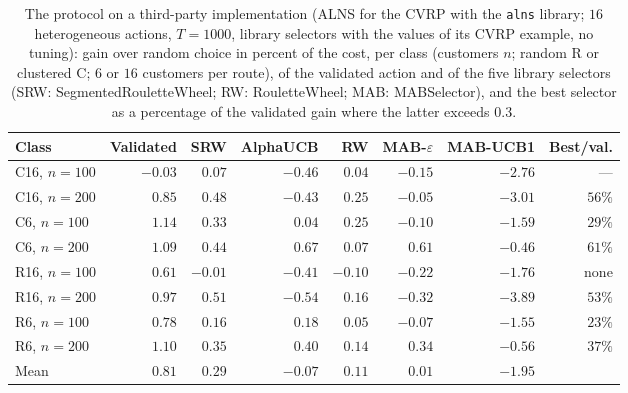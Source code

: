 \begin{table}[t]
\caption{The protocol on a third-party implementation (ALNS for the CVRP with the \texttt{alns} library; $16$ heterogeneous actions, $T=1000$, library selectors with the values of its CVRP example, no tuning): gain over random choice in percent of the cost, per class (customers $n$; random R or clustered C; $6$ or $16$ customers per route), of the validated action and of the five library selectors (SRW: SegmentedRouletteWheel; RW: RouletteWheel; MAB: MABSelector), and the best selector as a percentage of the validated gain where the latter exceeds $0.3$.}
\label{tab:cvrp}
\centering
{\scriptsize\setlength{\tabcolsep}{3pt}
\begin{tabular}{@{}lrrrrrrr@{}}
\toprule
Class & Validated & SRW & AlphaUCB & RW & MAB-$\varepsilon$ & MAB-UCB1 & Best/val. \\
\midrule
C16, $n=100$ & $-0.03$ & $0.07$ & $-0.46$ & $0.04$ & $-0.15$ & $-2.76$ & --- \\
C16, $n=200$ & $0.85$ & $0.48$ & $-0.43$ & $0.25$ & $-0.05$ & $-3.01$ & $56\%$ \\
C6, $n=100$ & $1.14$ & $0.33$ & $0.04$ & $0.25$ & $-0.10$ & $-1.59$ & $29\%$ \\
C6, $n=200$ & $1.09$ & $0.44$ & $0.67$ & $0.07$ & $0.61$ & $-0.46$ & $61\%$ \\
R16, $n=100$ & $0.61$ & $-0.01$ & $-0.41$ & $-0.10$ & $-0.22$ & $-1.76$ & none \\
R16, $n=200$ & $0.97$ & $0.51$ & $-0.54$ & $0.16$ & $-0.32$ & $-3.89$ & $53\%$ \\
R6, $n=100$ & $0.78$ & $0.16$ & $0.18$ & $0.05$ & $-0.07$ & $-1.55$ & $23\%$ \\
R6, $n=200$ & $1.10$ & $0.35$ & $0.40$ & $0.14$ & $0.34$ & $-0.56$ & $37\%$ \\
\midrule
Mean & $0.81$ & $0.29$ & $-0.07$ & $0.11$ & $0.01$ & $-1.95$ & \\
\bottomrule
\end{tabular}}
\end{table}
